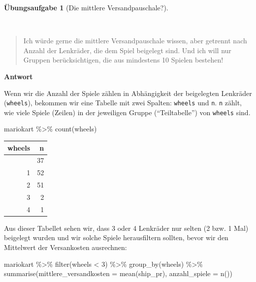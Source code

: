\documentclass[
  letterpaper,
]{scrbook}
\newenvironment{Shaded}{\begin{snugshade}}{\end{snugshade}}
\newcommand{\AttributeTok}[1]{\textcolor[rgb]{0.40,0.45,0.13}{#1}}
\newcommand{\DecValTok}[1]{\textcolor[rgb]{0.68,0.00,0.00}{#1}}
\newcommand{\FunctionTok}[1]{\textcolor[rgb]{0.28,0.35,0.67}{#1}}
\newcommand{\NormalTok}[1]{\textcolor[rgb]{0.00,0.23,0.31}{#1}}
\newcommand{\SpecialCharTok}[1]{\textcolor[rgb]{0.37,0.37,0.37}{#1}}
\theoremstyle{definition}
\theoremstyle{definition}
\theoremstyle{definition}
\newtheorem{exercise}{Übungsaufgabe}[chapter]
\theoremstyle{remark}
\begin{document}
\begin{exercise}[Die mittlere
Versandpauschale?]\protect\hypertarget{exr-Forschungsfrage2}{}\label{exr-Forschungsfrage2}

~

\begin{quote}
{} Ich würde gerne die mittlere Versandpauschale wissen,
aber getrennt nach Anzahl der Lenkräder, die dem Spiel beigelegt sind.
Und ich will nur Gruppen berücksichtigen, die aus mindestens 10 Spielen
bestehen!
\end{quote}

\textbf{Antwort}

Wenn wir die Anzahl der Spiele zählen in Abhängigkeit der beigelegten
Lenkräder (\texttt{wheels}), bekommen wir eine Tabelle mit zwei Spalten:
\texttt{wheels} und \texttt{n}. \texttt{n} zählt, wie viele Spiele
(Zeilen) in der jeweiligen Gruppe (``Teiltabelle'') von \texttt{wheels}
sind.

\begin{Shaded}
\begin{Highlighting}[]
\NormalTok{mariokart }\SpecialCharTok{\%\textgreater{}\%}
  \FunctionTok{count}\NormalTok{(wheels)}
\end{Highlighting}
\end{Shaded}

\begin{longtable}[]{@{}rr@{}}
\toprule\noalign{}
wheels & n \\
\midrule\noalign{}
\endhead
\bottomrule\noalign{}
\endlastfoot
0 & 37 \\
1 & 52 \\
2 & 51 \\
3 & 2 \\
4 & 1 \\
\end{longtable}

Aus dieser Tabellet sehen wir, dass 3 oder 4 Lenkräder nur selten (2
bzw. 1 Mal) beigelegt wurden und wir solche Spiele herausfiltern
sollten, bevor wir den Mittelwert der Versankosten ausrechnen:

\begin{Shaded}
\begin{Highlighting}[]
\NormalTok{mariokart }\SpecialCharTok{\%\textgreater{}\%}
  \FunctionTok{filter}\NormalTok{(wheels }\SpecialCharTok{\textless{}} \DecValTok{3}\NormalTok{) }\SpecialCharTok{\%\textgreater{}\%} 
  \FunctionTok{group\_by}\NormalTok{(wheels) }\SpecialCharTok{\%\textgreater{}\%} 
  \FunctionTok{summarise}\NormalTok{(}\AttributeTok{mittlere\_versandkosten =} \FunctionTok{mean}\NormalTok{(ship\_pr),}
            \AttributeTok{anzahl\_spiele =} \FunctionTok{n}\NormalTok{())}
\end{Highlighting}
\end{Shaded}


\end{exercise}
\end{document}

